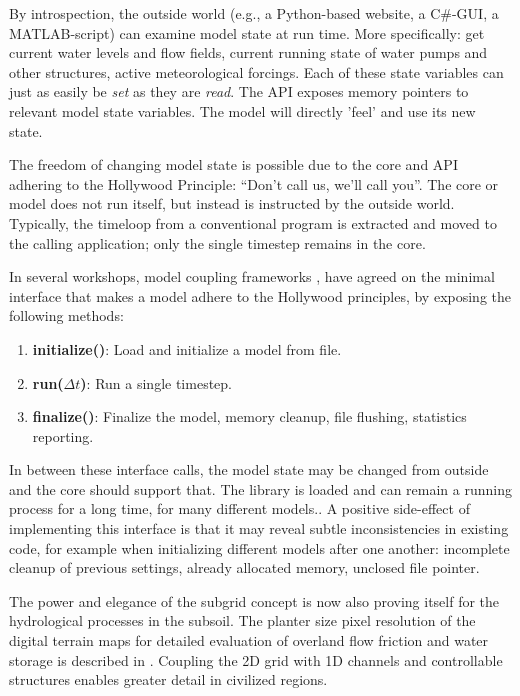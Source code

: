 \documentclass[a4paper]{article}
\begin{document}
By introspection, the outside world (e.g., a Python-based website, a C\#-\ac{GUI}, a MATLAB-script) can examine model state at run time. More specifically: get current water levels and flow fields, current running state of water pumps and other structures, active meteorological forcings. Each of these state variables can just as easily be \emph{set} as they are \emph{read}. The \ac{API} exposes memory pointers to relevant model state variables. The model will directly 'feel' and use its new state.

The freedom of changing model state is possible due to the core and \ac{API} adhering to the Hollywood Principle: ``Don't call us, we'll call you''. The core or model does not run itself, but instead is instructed by the outside world. Typically, the timeloop from a conventional program is extracted and moved to the calling application; only the single timestep remains in the core.

In several workshops, model coupling frameworks \citep[see][for an overview]{Jagers2010}, have agreed on the minimal interface that makes a model adhere to the Hollywood principles, by exposing the following methods:

\begin{enumerate}
\item \textbf{initialize()}: Load and initialize a model from file.
\item \textbf{run($\Delta t$)}: Run a single timestep.
\item \textbf{finalize()}: Finalize the model, memory cleanup, file flushing, statistics reporting.
\end{enumerate}

In between these interface calls, the model state may be changed from outside and the core should support that. The library is loaded and can remain a running process for a long time, for many different models.. A positive side-effect of implementing this interface is that it may reveal subtle inconsistencies in existing code, for example when initializing different models after one another: incomplete cleanup of previous settings, already allocated memory, unclosed file pointer.

The power and elegance of the subgrid concept is now also proving itself for the hydrological processes in the subsoil. The planter size pixel resolution of the digital terrain maps for detailed evaluation of overland flow friction and water storage is described in \citet{Stelling2012}. Coupling the 2D grid with 1D channels and controllable structures enables greater detail in civilized regions.
\end{document}
